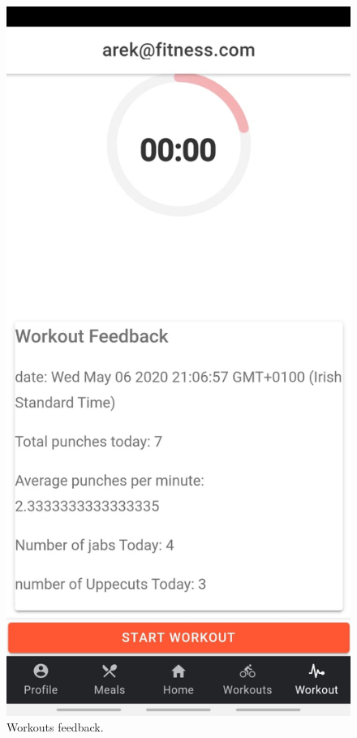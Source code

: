 \documentclass[a4paper,12pt]{report}
\begin{document}
\begin{figure}[ht]
\begin{minipage}[b]{0.5\linewidth}
    \includegraphics[width=.7\linewidth]{images/aplicationImages/workoutFeedback.jpeg} 
    \caption{Workouts feedback.} 
    \vspace{4ex}
  \end{minipage}
\end{figure}
\end{document}
